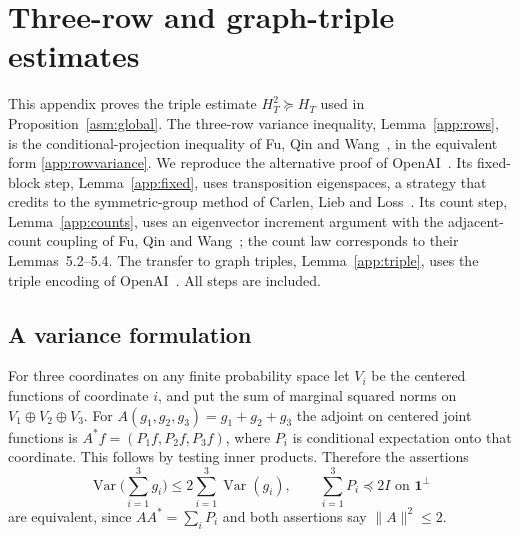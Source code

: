 \appendix
\section{Three-row and graph-triple estimates}\label{app:section}
This appendix proves the triple estimate $H_T^2\succeq H_T$ used in
Proposition~\ref{asm:global}. The three-row variance inequality,
Lemma~\ref{app:rows}, is the conditional-projection inequality of Fu, Qin and
Wang~\cite[Theorem~5.1]{FQW26}, in the equivalent form \eqref{app:rowvariance}.
We reproduce the alternative proof of OpenAI~\cite[Section~3]{OAI26}. Its
fixed-block step, Lemma~\ref{app:fixed}, uses transposition eigenspaces, a
strategy that~\cite[Section~3]{OAI26} credits to the symmetric-group method
of Carlen, Lieb and Loss~\cite[Section~2]{CLL06}. Its count step,
Lemma~\ref{app:counts}, uses an eigenvector increment argument with the
adjacent-count coupling of Fu, Qin and Wang~\cite[Lemma~5.2]{FQW26}; the count
law corresponds to their Lemmas~5.2--5.4. The transfer to graph triples,
Lemma~\ref{app:triple}, uses the triple encoding of
OpenAI~\cite[Proposition~4.1]{OAI26}. All steps are included.

\subsection{A variance formulation}
For three coordinates on any finite probability space let $V_i$ be the
centered functions of coordinate $i$, and put the sum of marginal squared
norms on $V_1\oplus V_2\oplus V_3$. For
$A(g_1,g_2,g_3)=g_1+g_2+g_3$ the adjoint on centered joint functions is
$A^*f=(P_1f,P_2f,P_3f)$, where $P_i$ is conditional expectation onto that
coordinate. This follows by testing inner products. Therefore the assertions
\begin{equation}\label{app:rowvariance}
 \operatorname{Var}\Big(\sum_{i=1}^3g_i\Big)\le2\sum_{i=1}^3\operatorname{Var}(g_i),
 \qquad \sum_{i=1}^3P_i\preceq2I\text{ on }\mathbf 1^\perp
\end{equation}
are equivalent, since $AA^*=\sum_iP_i$ and both assertions say
$\lVert A\rVert^2\le2$.

